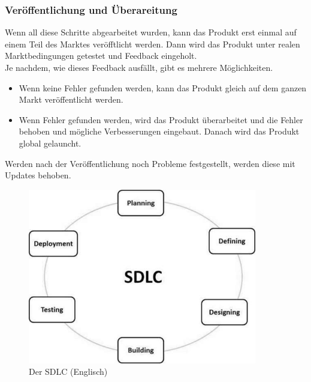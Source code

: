\documentclass[a4paper, 10pt]{scrartcl}
\begin{document}
\subsubsection{Veröffentlichung und Überareitung}
Wenn all diese Schritte abgearbeitet wurden, kann das Produkt erst einmal auf einem Teil des Marktes veröfftlicht werden. Dann wird das Produkt unter realen Marktbedingungen getestet und Feedback eingeholt.\\
Je nachdem, wie dieses Feedback ausfällt, gibt es mehrere Möglichkeiten. 
\begin{itemize}
\item Wenn keine Fehler gefunden werden, kann das Produkt gleich auf dem ganzen Markt veröffentlicht werden.
\item Wenn Fehler gefunden werden, wird das Produkt überarbeitet und die Fehler behoben und mögliche Verbesserungen eingebaut. Danach wird das Produkt global gelauncht.
\end{itemize}
Werden nach der Veröffentlichung noch Probleme festgestellt, werden diese mit Updates behoben. \citep{stoica}

\begin{figure}
\begin{center}
\includegraphics[width=10cm]{sdlc.jpg}
\caption{Der SDLC (Englisch)}
\end{center}
\end{figure}
\end{document}
